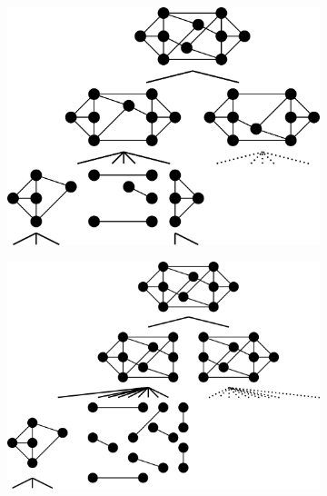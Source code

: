 \begin{figure}\centering%
    \begin{subfigure}{0.5\linewidth}\centering
        \includegraphics[height=\myMinHeight]{../../img/svg/new2_overconstrained_optimal}
        \caption{}\label{fig:overconstrained:optimal}
    \end{subfigure}%
    \hfill
    \begin{subfigure}{0.5\linewidth}\centering
        \includegraphics[height=\myMinHeight]{../../img/svg/new2_overconstrained_not_optimal}

\end{subfigure}
\end{figure}
